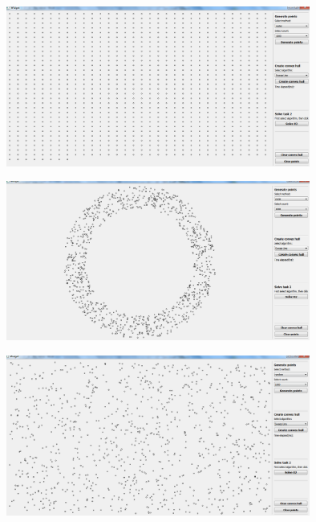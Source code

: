 \documentclass[12pt]{article}
\begin{document}
\begin{center}
   \includegraphics[width=10cm]{./img/points_generate_grid_1000.png}
\end{center}

\begin{center}
   \includegraphics[width=10cm]{./img/points_generate_circle_1000.png}
\end{center}

\begin{center}
   \includegraphics[width=10cm]{./img/points_generate_random_1000.png}
\end{center}
\end{document}
